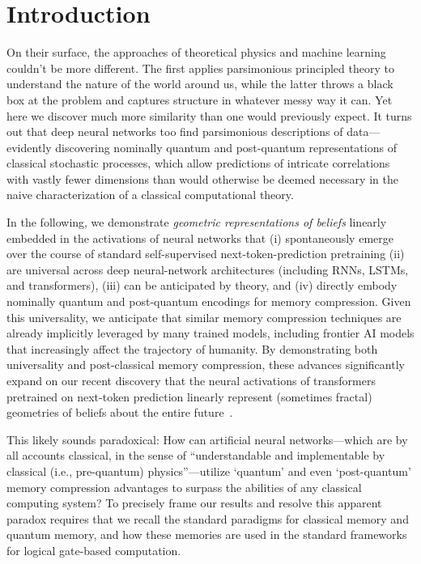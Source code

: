 \documentclass[prx,nofootinbib,onecolumn,showkeys,groupaddress,preprintnumbers,floatfix,
superscriptaddress]{revtex4-1}
\begin{document}
\section{Introduction}

On their surface,
the approaches of 
theoretical physics and machine learning 
couldn't be more different.
The first applies parsimonious principled theory to understand the nature of the world around us, while the latter throws a black box at the problem and captures structure in whatever messy way 
it can. %
Yet here we discover much more similarity than 
one would previously expect.  It turns out that deep neural networks too
find
parsimonious descriptions of data---evidently discovering nominally quantum and post-quantum representations of classical stochastic processes, which allow predictions of intricate correlations with vastly fewer dimensions than would otherwise be 
deemed necessary
in the naive characterization of a classical computational theory.

In the following, 
we demonstrate %
\emph{geometric representations of beliefs} 
linearly embedded
in the activations of neural networks 
that 
(i) 
spontaneously emerge over the course of standard 
self-supervised 
next-token-prediction
pretraining
(ii)
are 
universal across
deep neural-network architectures 
(including RNNs, LSTMs, and transformers),
(iii)
can be anticipated by theory,
and
(iv) 
directly
embody %
nominally quantum and post-quantum 
encodings for 
memory compression.
Given this universality, 
we anticipate that similar memory compression techniques are 
already implicitly leveraged by many trained models, including frontier AI models 
that increasingly affect the trajectory of humanity.
By demonstrating both universality and post-classical 
memory compression,
these advances
significantly %
expand on
our recent discovery that 
the neural activations of 
transformers 
pretrained on next-token prediction
linearly represent %
(sometimes fractal)
geometries of 
beliefs about the entire future~\cite{Shai24_Transformers, Piotrowski25_Constrained}.

This likely sounds paradoxical:
How can artificial neural networks---which are by all accounts classical, in the sense of ``understandable and implementable by classical (i.e., pre-quantum) physics''---utilize `quantum' and even `post-quantum' memory compression advantages 
to surpass the abilities of 
any classical 
computing 
system?
To precisely frame our results
and resolve this apparent paradox
requires 
that we recall the standard paradigms for classical memory and quantum memory, 
and how these memories are used in the standard frameworks for 
logical gate-based
computation.
\end{document}
